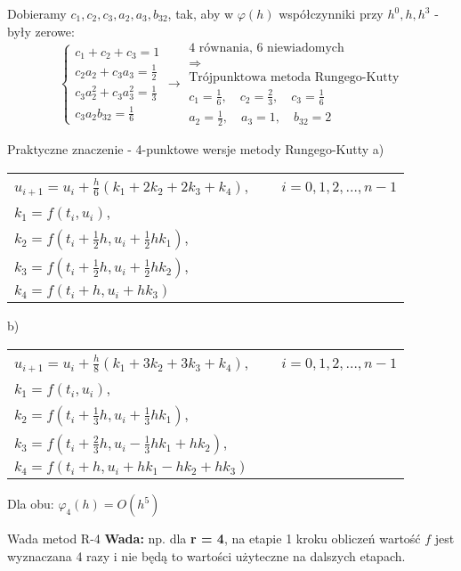\begin{frame}
    \begin{center}
    	Dobieramy $c_1,c_2,c_3,a_2,a_3,b_{32}$, tak, aby w $\varphi(h)$ współczynniki przy $h^0,h,h^3$ - były zerowe:
        $$\left\{\begin{array}{l}
        c_1+c_2+c_3 = 1\\
        c_2a_2+c_3a_3 = \frac{1}{2} \\
        c_3a_2^2+c_3a_3^2 = \frac{1}{3} \\
        c_3a_2b_{32} = \frac{1}{6}
        \end{array}\right.\rightarrow\left.\begin{array}{c}
        \text{4 równania, 6 niewiadomych}\\
        \Rightarrow \\
        \text{Trójpunktowa metoda Rungego-Kutty} \\
        c_1 = \frac{1}{6},\quad c_2 = \frac{2}{3}, \quad c_3 = \frac{1}{6} \\
        a_2 = \frac{1}{2},\quad a_3 = 1, \quad b_{32} = 2
        \end{array}\right.$$
    \end{center}
\end{frame}
\begin{frame}{Praktyczne znaczenie - 4-punktowe wersje metody Rungego-Kutty}
	a)
    \begin{center}
    	\begin{tabular}{l}
    		$u_{i+1} = u_i+\frac{h}{6}(k_1+2k_2+2k_3+k_4)$, $\qquad i = 0,1,2, \ldots,n-1$\\
            $k_1 = f(t_i,u_i)$,\\
            $k_2 = f(t_i+\frac{1}{2}h,u_i+\frac{1}{2}hk_1)$,\\
            $k_3 = f(t_i+\frac{1}{2}h,u_i+\frac{1}{2}hk_2)$,\\
            $k_4 = f(t_i+h,u_i+hk_3)$
    	\end{tabular}
    \end{center}
    b) 
      \begin{center}
    	\begin{tabular}{l}
    		$u_{i+1} = u_i+\frac{h}{8}(k_1+3k_2+3k_3+k_4)$, $\qquad i = 0,1,2, \ldots,n-1$\\
            $k_1 = f(t_i,u_i)$,\\
            $k_2 = f(t_i+\frac{1}{3}h,u_i+\frac{1}{3}hk_1)$,\\
            $k_3 = f(t_i+\frac{2}{3}h,u_i-\frac{1}{3}hk_1+hk_2)$,\\
            $k_4 = f(t_i+h,u_i+hk_1-hk_2+hk_3)$
    	\end{tabular}
    \end{center}
  	Dla obu: $\varphi_4(h) = O(h^5)$
\end{frame}
\begin{frame}{Wada metod R-4}
	\textbf{Wada:} \quad np. dla \textbf{r = 4}, na etapie 1 kroku obliczeń wartość $f$ jest wyznaczana 4 razy i nie będą to wartości użyteczne na dalszych etapach.\newline\par
\end{frame}
